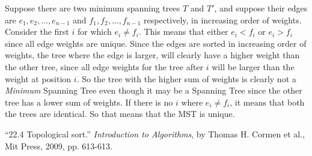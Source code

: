 \documentclass[addpoints]{exam}
\begin{document}
\begin{questions}

Suppose there are two minimum spanning trees $T$ and $T'$, and suppose their edges are $e_1, e_2, \dots, e_{n-1}$ and $f_1, f_2, \dots, f_{n-1}$ respectively, in increasing order of weights. Consider the first $i$ for which $e_i \neq f_i$. This means that either $e_i < f_i$ or $e_i > f_i$ since all edge weights are unique. Since the edges are sorted in increasing order of weights, the tree where the edge is larger, will clearly have a higher weight than the other tree, since all edge weights for the tree after $i$ will be larger than the weight at position $i$. So the tree with the higher sum of weights is clearly not a \textit{Minimum} Spanning Tree even though it may be a Spanning Tree since the other tree has a lower sum of weights. If there is no $i$ where $e_i \neq f_i$, it means that both the trees are identical. So that means that the MST is unique.

\end{questions}


\begin{thebibliography}{9}

 \enquote{22.4 Topological sort.} \textit{Introduction to Algorithms}, by Thomas H. Cormen et al., Mit Press, 2009, pp. 613-613.

\end{thebibliography}
\end{document}
